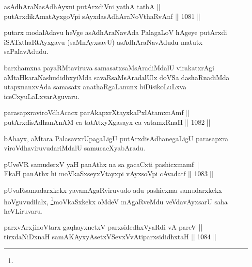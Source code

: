 \begin{shl}
asAdhAraNasAdhAyxni putArxdiVni yathA tathA || \\
putArxdikAmatAyxgoV\s pi sAyxdasAdhAraNoV\s thaRvAnf ||  1081 ||  
\end{shl}

\begin{artha}
putarx modalAdavu heVge asAdhAraNavAda PalagaLoV hAgeye putArxdi iSATxthaRtAyxgavu (saMnAyxsavU) asAdhAraNavAdudu matutx saPalavAdudu.
\end{artha}

\begin{artha}
barxhamxna payaRMtaviruva samasatxsaMsAradiMdalU virakatxrAgi aMtaHkaraNashudidhxyiMda savaRsaMsAradalUlx doVSa dashaRnadiMda utapxnanxvAda samasatx anathaRgaLanunx biDisikoLuLxva iceCxyuLaLxvarAguvaru.
\end{artha}


\begin{shl}
parasapxraviroVdhAcacx parAkapxrXtayxkaPxlAtamxnAmf || \\
putArxdisAdhanAnAM ca tatAtxyXgasayx ca vatamxRnaH ||  1082 ||  
\end{shl}

\begin{artha}
bAhayx, aMtara PalasavxrUpagaLigU putArxdisAdhanegaLigU parasapxra viroVdhaviruvudariMdalU samucacXyabAradu.
\end{artha}


\begin{shl}
pUveVR samuderxV yaH panAthx na sa gacaCxti pashicxmamf ||  \\
EkaH panAthx hi moVkaSxseyxVtayxpi vAyxsoV\s pi cAvadatf ||  1083 ||  
\end{shl}

\begin{artha}
pUvaRsamudarxkekx yavamAgaRviruvudo adu pashicxma samudarxkekx hoVguvudilalx, \footnote[1]{}moVkaSxkekx oMdeV mAgaRveMdu veVdavAyxsarU saha heVLiruvaru.
\end{artha}



\begin{shl}
parxvArxjinoV\s tarx gaqhayxnetxV parxsidedhxVyaRdi vA pareV || \\
tirxdaNiDxnaH samAKAyxyAsetxVSevxVvAtiparxsididhxtaH ||  1084 ||  
\end{shl}

